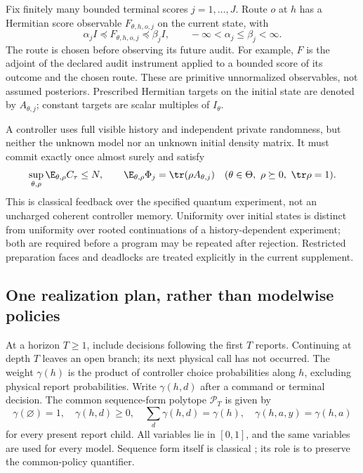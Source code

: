 Fix finitely many bounded terminal scores $j=1,\ldots,J$. Route $o$ at $h$ has a Hermitian score observable $F_{\theta,h,o,j}$ on the current state, with
\begin{equation}\label{eq:syn-score-bounds}
 \alpha_jI\preccurlyeq F_{\theta,h,o,j}\preccurlyeq\beta_jI,
 \qquad -\infty<\alpha_j\le\beta_j<\infty.
\end{equation}
The route is chosen before observing its future audit. For example, $F$ is the adjoint of the declared audit instrument applied to a bounded score of its outcome and the chosen route. These are primitive unnormalized observables, not assumed posteriors. Prescribed Hermitian targets on the initial state are denoted by $A_{\theta,j}$; constant targets are scalar multiples of $I_\theta$.

A controller uses full visible history and independent private randomness, but neither the unknown model nor an unknown initial density matrix. It must commit exactly once almost surely and satisfy
\begin{equation}\label{eq:syn-goal}
 \sup_{\theta,\rho}\E_{\theta,\rho}C_\tau\le N,\qquad
 \E_{\theta,\rho}\Phi_j=\tr(\rho A_{\theta,j})
 \quad(\theta\in\Theta,\ \rho\succeq0,\ \tr\rho=1).
\end{equation}
This is classical feedback over the specified quantum experiment, not an uncharged coherent controller memory. Uniformity over initial states is distinct from uniformity over rooted continuations of a history-dependent experiment; both are required before a program may be repeated after rejection. Restricted preparation faces and deadlocks are treated explicitly in the current supplement.

\subsection{One realization plan, rather than modelwise policies}
At a horizon $T\ge1$, include decisions following the first $T$ reports. Continuing at depth $T$ leaves an open branch; its next physical call has not occurred. The weight $\gamma(h)$ is the product of controller choice probabilities along $h$, excluding physical report probabilities. Write $\gamma(h,d)$ after a command or terminal decision. The common sequence-form polytope $\mathcal P_T$ is given by
\begin{equation}\label{eq:realization-plan}
 \gamma(\varnothing)=1,\quad \gamma(h,d)\ge0,\quad
 \sum_d\gamma(h,d)=\gamma(h),\quad
 \gamma(h,a,y)=\gamma(h,a)
\end{equation}
for every present report child. All variables lie in $[0,1]$, and the same variables are used for every model. Sequence form itself is classical \cite{Stengel96}; its role is to preserve the common-policy quantifier.

